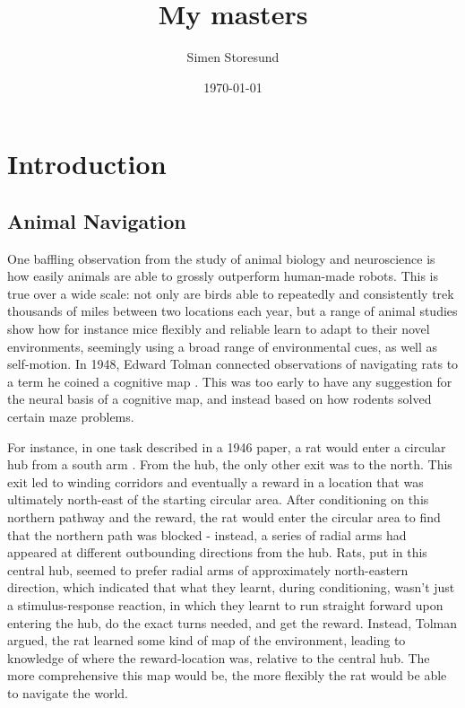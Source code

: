 \documentclass{article}
\title{My masters}
\author{Simen Storesund}
\date{\today}
\begin{document}
    \maketitle
    \section{Introduction}
    \subsection{Animal Navigation}
    One baffling observation from the study of animal biology and neuroscience is how easily animals are able to grossly outperform human-made robots. This is true over a wide scale: not only are birds able to repeatedly and consistently trek thousands of miles between two locations each year, but a range of animal studies show how for instance mice flexibly and reliable learn to adapt to their novel environments, seemingly using a broad range of environmental cues, as well as self-motion.
    In 1948, Edward Tolman connected observations of navigating rats to a term he coined a cognitive map \parencite{Tolman1948}. This was too early to have any suggestion for the neural basis of a cognitive map, and instead based on how rodents solved certain maze problems.

    For instance, in one task described in a 1946 paper, a rat would enter a circular hub from a south arm \parencite{Tolman1946}. From the hub, the only other exit was to the north. This exit led to winding corridors and eventually a reward in a location that was ultimately north-east of the starting circular area.
    After conditioning on this northern pathway and the reward, the rat would enter the circular area to find that the northern path was blocked - instead, a series of radial arms had appeared at different outbounding directions from the hub. Rats, put in this central hub, seemed to prefer radial arms of approximately north-eastern direction, which indicated that what they learnt, during conditioning, wasn't just a stimulus-response reaction, in which they learnt to run straight forward upon entering the hub, do the exact turns needed, and get the reward. Instead, Tolman argued, the rat learned some kind of map of the environment, leading to knowledge of where the reward-location was, relative to the central hub. The more comprehensive this map would be, the more flexibly the rat would be able to navigate the world.
\end{document}
